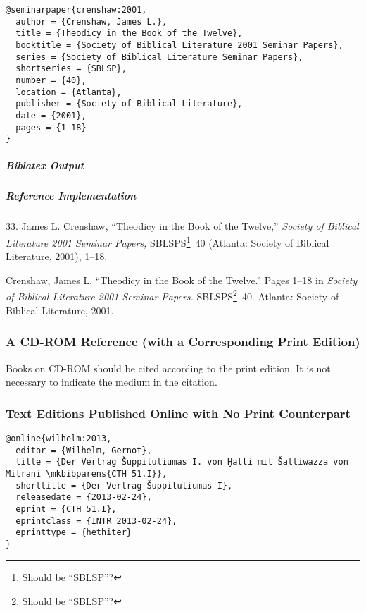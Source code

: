 \documentclass[a4paper]{article}
\newenvironment{biboutput}{%
  \subparagraph{Biblatex Output}
}{\color{black}}
\newenvironment{refimp}{%
  \subparagraph{Reference Implementation}
  \color{reference-colour}
  \rm
}{\par\color{black}}
\begin{document}
\begin{lstlisting}
@seminarpaper{crenshaw:2001,
  author = {Crenshaw, James L.},
  title = {Theodicy in the Book of the Twelve},
  booktitle = {Society of Biblical Literature 2001 Seminar Papers},
  series = {Society of Biblical Literature Seminar Papers},
  shortseries = {SBLSP},
  number = {40},
  location = {Atlanta},
  publisher = {Society of Biblical Literature},
  date = {2001},
  pages = {1-18}
}
\end{lstlisting}

\begin{biboutput}
\end{biboutput}

\begin{refimp}
  \hspace*{\bibindent}33. James L. Crenshaw, “Theodicy in the Book of the
  Twelve,” \emph{Society of Biblical Literature 2001 Seminar Papers,}
  SBLSPS\footnote{Should be “SBLSP”?}~40 (Atlanta: Society of Biblical
  Literature, 2001), 1–18.
  
  \hangindent\bibindent Crenshaw, James L. “Theodicy in the Book of the
  Twelve.” Pages 1–18 in \emph{Society of Biblical Literature 2001 Seminar
  Papers.} SBLSPS\footnote{Should be “SBLSP”?}~40. Atlanta: Society of
  Biblical Literature, 2001.

\end{refimp}

\subsubsection{A CD-ROM Reference (with a Corresponding Print Edition)}

Books on CD-ROM should be cited according to the print edition. It is not
necessary to indicate the medium in the citation.

\subsubsection{Text Editions Published Online with No Print Counterpart}

\begin{lstlisting}
@online{wilhelm:2013,
  editor = {Wilhelm, Gernot},
  title = {Der Vertrag Šuppiluliumas I. von Ḫatti mit Šattiwazza von Mitrani \mkbibparens{CTH 51.I}},
  shorttitle = {Der Vertrag Šuppiluliumas I},
  releasedate = {2013-02-24},
  eprint = {CTH 51.I},
  eprintclass = {INTR 2013-02-24},
  eprinttype = {hethiter}
}
\end{lstlisting}
\end{document}
